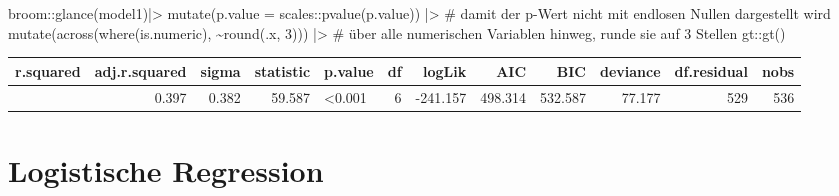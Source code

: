 \documentclass[
  10pt,
  letterpaper,
  a4paper, twoside]{scrreprt}
\newenvironment{Shaded}{\begin{snugshade}}{\end{snugshade}}
\newcommand{\AttributeTok}[1]{\textcolor[rgb]{0.40,0.45,0.13}{#1}}
\newcommand{\CommentTok}[1]{\textcolor[rgb]{0.37,0.37,0.37}{#1}}
\newcommand{\DecValTok}[1]{\textcolor[rgb]{0.68,0.00,0.00}{#1}}
\newcommand{\FunctionTok}[1]{\textcolor[rgb]{0.28,0.35,0.67}{#1}}
\newcommand{\NormalTok}[1]{\textcolor[rgb]{0.00,0.23,0.31}{#1}}
\newcommand{\SpecialCharTok}[1]{\textcolor[rgb]{0.37,0.37,0.37}{#1}}
\begin{document}
\begin{Shaded}
\begin{Highlighting}[]

\NormalTok{broom}\SpecialCharTok{::}\FunctionTok{glance}\NormalTok{(model1)}\SpecialCharTok{|\textgreater{}}
 \FunctionTok{mutate}\NormalTok{(}\AttributeTok{p.value =}\NormalTok{ scales}\SpecialCharTok{::}\FunctionTok{pvalue}\NormalTok{(p.value)) }\SpecialCharTok{|\textgreater{}} \CommentTok{\# damit der p{-}Wert nicht mit endlosen Nullen dargestellt wird}
 \FunctionTok{mutate}\NormalTok{(}\FunctionTok{across}\NormalTok{(}\FunctionTok{where}\NormalTok{(is.numeric), }\SpecialCharTok{\textasciitilde{}}\FunctionTok{round}\NormalTok{(.x, }\DecValTok{3}\NormalTok{))) }\SpecialCharTok{|\textgreater{}} \CommentTok{\# über alle numerischen Variablen hinweg, runde sie auf 3 Stellen}
\NormalTok{ gt}\SpecialCharTok{::}\FunctionTok{gt}\NormalTok{()}
\end{Highlighting}
\end{Shaded}

\begin{longtable*}{rrrrlrrrrrrr}
\toprule
r.squared & adj.r.squared & sigma & statistic & p.value & df & logLik & AIC & BIC & deviance & df.residual & nobs \\ 
\midrule{} & 0.397 & 0.382 & 59.587 & <0.001 & 6 & -241.157 & 498.314 & 532.587 & 77.177 & 529 & 536 \\ 
\bottomrule
\end{longtable*}

\section*{Logistische Regression}\label{logistische-regression-1}

\end{document}
